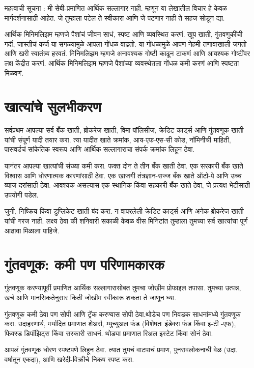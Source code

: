 महत्वाची सूचना : मी सेबी-प्रमाणित आर्थिक सल्लागार नाही. म्हणून या लेखातील विचार हे केवळ मार्गदर्शनासाठी आहेत. जे तुम्हाला पटेल ते स्वीकारा आणि जे पटणार नाही ते सहज सोडून द्या.

आर्थिक मिनिमलिझम म्हणजे पैशांचं जीवन साधं, स्पष्ट आणि व्यवस्थित करणं. खूप खाती, गुंतवणुकींची गर्दी, जास्तीचं कर्ज या सगळ्यामुळे आपला गोंधळ वाढतो. या गोंधळामुळे आपण नेहमी तणावाखाली जगतो आणि खरी स्वातंत्र्य हरवतं. मिनिमलिझम म्हणजे अनावश्यक गोष्टी काढून टाकणं आणि आवश्यक गोष्टींवर लक्ष केंद्रीत करणं. आर्थिक मिनिमलिझम म्हणजे पैशांच्या व्यवस्थेतला गोंधळ कमी करणं आणि स्पष्टता मिळवणं.



\section*{खात्यांचे सुलभीकरण}

सर्वप्रथम आपल्या सर्व बँक खाती, ब्रोकरेज खाती, विमा पॉलिसीज, क्रेडिट कार्ड्स आणि गुंतवणूक खाती यांची संपूर्ण यादी तयार करा. त्या यादीत खाते क्रमांक, आय-एफ-एस-सी कोड, नॉमिनीची माहिती, पासवर्डचं सांकेतिक स्वरूप आणि आर्थिक सल्लागाराचा संपर्क क्रमांक लिहून ठेवा.

यानंतर आपल्या खात्यांची संख्या कमी करा. फक्त दोन ते तीन बँक खाती ठेवा. एक सरकारी बँक खाते विश्वास आणि धोरणात्मक कारणांसाठी ठेवा. एक खाजगी तंत्रज्ञान-सज्ज बँक खाते ऑटो-पे आणि उच्च व्याज दरांसाठी ठेवा.
आवश्यक असल्यास एक स्थानिक किंवा सहकारी बँक खाते ठेवा, जे प्रत्यक्ष भेटीसाठी उपयोगी पडेल.

जुनी, निष्क्रिय किंवा डुप्लिकेट खाती बंद करा. न वापरलेली क्रेडिट कार्ड्स आणि अनेक ब्रोकरेज खाती यांची गरज नाही. लक्ष्य ठेवा की शनिवारी सकाळी केवळ वीस मिनिटांत तुम्हाला तुमच्या सर्व खात्यांचा पूर्ण आढावा मिळाला पाहिजे.



\section*{गुंतवणूक: कमी पण परिणामकारक}

गुंतवणूक करण्यापूर्वी प्रमाणित आर्थिक सल्लागारासोबत तुमचा जोखीम प्रोफाइल तपासा. तुमच्या उत्पन्न, खर्च आणि मानसिकतेनुसार किती जोखीम स्वीकारू शकता ते जाणून घ्या.

गुंतवणूक कमी ठेवा पण सोपी आणि ट्रॅक करण्यास सोपी ठेवा.थोडेच पण निवडक साधनांमध्ये गुंतवणूक करा.
उदाहरणार्थ, मर्यादित प्रमाणात शेअर्स, म्युच्युअल फंड (विशेषतः इंडेक्स फंड किंवा इ-टी -एफ), फिक्स्ड डिपॉझिट्स किंवा सरकारी साधनं. थोड्या प्रमाणात रिअल इस्टेट किंवा सोनं ठेवा.

आपलं गुंतवणूक धोरण स्पष्टपणे लिहून ठेवा. त्यात तुमचं वाटपाचं प्रमाण, पुनरावलोकनाची वेळ (उदा. वर्षातून एकदा), आणि खरेदी-विक्रीचे निकष स्पष्ट करा.

